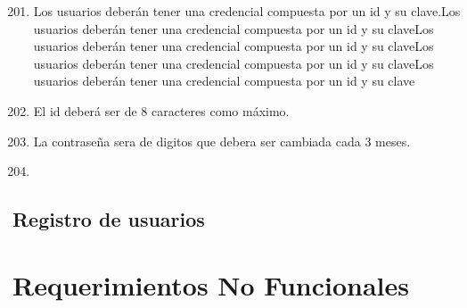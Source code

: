 \begin{flushright}

	\begin{enumerate} [label=RF-\arabic*. , align=left]
		\setcounter{enumi}{200}	 %
		\item 
		Los usuarios deberán tener una credencial compuesta por un id y su clave.Los usuarios deberán tener una credencial compuesta por un id y su claveLos usuarios deberán tener una credencial compuesta por un id y su claveLos usuarios deberán tener una credencial compuesta por un id y su claveLos usuarios deberán tener una credencial compuesta por un id y su clave
		\item  
		El id deberá ser de 8 caracteres como máximo.
		\item  
		La contraseña sera de digitos que debera ser cambiada cada 3 meses.
		
		\item \blindtext
	\end{enumerate}

\end{flushright}

\subsection{Registro de usuarios}


\section{Requerimientos No Funcionales}


